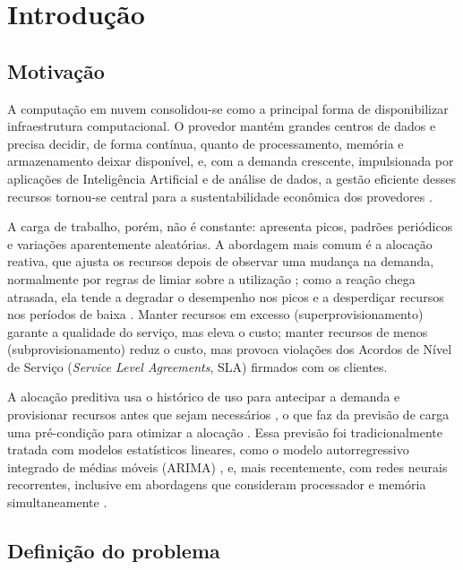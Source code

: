 \chapter{Introdução}
\label{cap:introducao}

\section{Motivação}
\label{sec:motivacao}

A computação em nuvem consolidou-se como a principal forma de disponibilizar infraestrutura computacional. O provedor mantém grandes centros de dados e precisa decidir, de forma contínua, quanto de processamento, memória e armazenamento deixar disponível, e, com a demanda crescente, impulsionada por aplicações de Inteligência Artificial e de análise de dados, a gestão eficiente desses recursos tornou-se central para a sustentabilidade econômica dos provedores \cite{rossi2023forecasting}.

A carga de trabalho, porém, não é constante: apresenta picos, padrões periódicos e variações aparentemente aleatórias. A abordagem mais comum é a alocação reativa, que ajusta os recursos depois de observar uma mudança na demanda, normalmente por regras de limiar sobre a utilização \cite{lorido2014autoscaling}; como a reação chega atrasada, ela tende a degradar o desempenho nos picos e a desperdiçar recursos nos períodos de baixa \cite{bodra2025ml}. Manter recursos em excesso (superprovisionamento) garante a qualidade do serviço, mas eleva o custo; manter recursos de menos (subprovisionamento) reduz o custo, mas provoca violações dos Acordos de Nível de Serviço (\textit{Service Level Agreements}, SLA) firmados com os clientes.

A alocação preditiva usa o histórico de uso para antecipar a demanda e provisionar recursos antes que sejam necessários \cite{bodra2025ml}, o que faz da previsão de carga uma pré-condição para otimizar a alocação \cite{rossi2023forecasting}. Essa previsão foi tradicionalmente tratada com modelos estatísticos lineares, como o modelo autorregressivo integrado de médias móveis (ARIMA) \cite{calheiros2015arima}, e, mais recentemente, com redes neurais recorrentes, inclusive em abordagens que consideram processador e memória simultaneamente \cite{xu2022esdnn}.

\section{Definição do problema}
\label{sec:definicao-problema}

